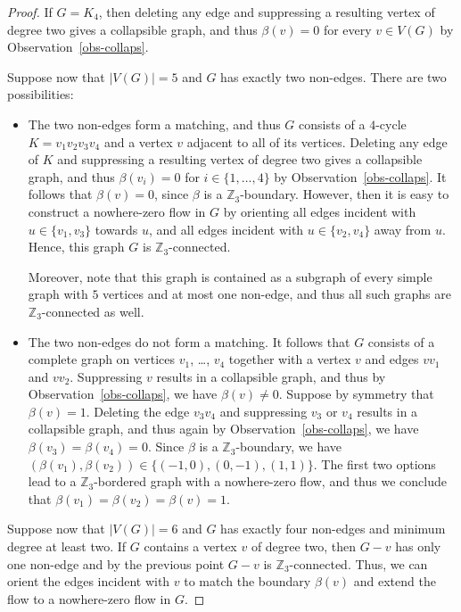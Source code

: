 \documentclass{article}
\newcommand{\Z}{\mathbb{Z}_3}
\begin{document}
\begin{proof}
If $G=K_4$, then deleting any edge and suppressing a resulting vertex of degree two gives a collapsible graph, and thus $\beta(v)=0$ for every $v\in V(G)$
by Observation~\ref{obs-collaps}.

Suppose now that $|V(G)|=5$ and $G$ has exactly two non-edges.  There are two possibilities:
\begin{itemize}
\item The two non-edges form a matching, and thus $G$ consists of a $4$-cycle $K=v_1v_2v_3v_4$ and a vertex $v$ adjacent to all of its vertices.
Deleting any edge of $K$ and suppressing a resulting vertex of degree two gives a collapsible graph, and thus $\beta(v_i)=0$ for $i\in\{1,\ldots,4\}$
by Observation~\ref{obs-collaps}.  It follows that $\beta(v)=0$, since $\beta$ is a $\Z$-boundary.  However, then it is easy to construct a nowhere-zero flow in $G$ by orienting all edges incident with $u \in \{v_1,v_3\}$ towards $u$, and all edges incident with $u \in \{v_2,v_4\}$ away from $u$.
Hence, this graph $G$ is $\Z$-connected.

Moreover, note that this graph is contained as a subgraph of every simple graph with $5$ vertices and at most one non-edge,
and thus all such graphs are $\Z$-connected as well. 
\item The two non-edges do not form a matching.  It follows that $G$ consists of a complete graph on vertices $v_1$, \ldots, $v_4$ together with a vertex $v$ and edges $vv_1$ and $vv_2$.
Suppressing $v$ results in a collapsible graph, and thus by Observation~\ref{obs-collaps}, we have $\beta(v)\neq 0$. Suppose by symmetry that $\beta(v)=1$.  Deleting the edge $v_3v_4$ and suppressing $v_3$ or $v_4$
results in a collapsible graph, and thus again by Observation~\ref{obs-collaps}, we have $\beta(v_3)=\beta(v_4)=0$.
Since $\beta$ is a $\Z$-boundary, we have $(\beta(v_1),\beta(v_2))\in \{(-1,0),(0,-1),(1,1)\}$.
The first two options lead to a $\Z$-bordered graph with a nowhere-zero flow, and thus we conclude that $\beta(v_1)=\beta(v_2)=\beta(v)=1$.
\end{itemize}

Suppose now that $|V(G)|=6$ and $G$ has exactly four non-edges and minimum degree at least two.  If $G$ contains a vertex $v$ of degree two,
then $G-v$ has only one non-edge and by the previous point $G-v$ is $\Z$-connected.  Thus, we can orient the edges incident with $v$ to match the boundary
$\beta(v)$ and extend the flow to a nowhere-zero flow in $G$.


\end{proof}
\end{document}
